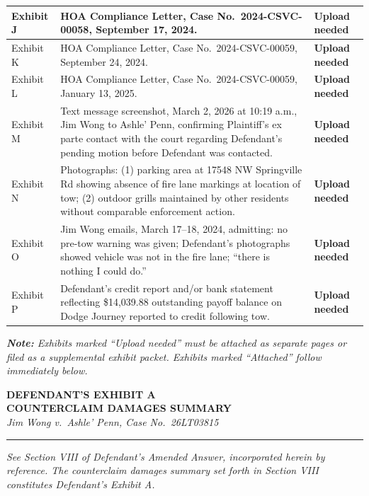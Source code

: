 \documentclass[12pt,letterpaper]{article}
\newcommand{\docshortname}{AMENDED ANSWER}
\begin{document}
\begin{singlespace}
\begin{longtable}{|p{0.7in}|p{4.8in}|p{0.7in}|}
\hline
Exhibit J & HOA Compliance Letter, Case No.\ 2024-CSVC-00058, September 17, 2024. & \textbf{Upload needed} \\
\hline
Exhibit K & HOA Compliance Letter, Case No.\ 2024-CSVC-00059, September 24, 2024. & \textbf{Upload needed} \\
\hline
Exhibit L & HOA Compliance Letter, Case No.\ 2024-CSVC-00059, January 13, 2025. & \textbf{Upload needed} \\
\hline
Exhibit M & Text message screenshot, March 2, 2026 at 10:19 a.m., Jim Wong to Ashle' Penn, confirming Plaintiff's ex parte contact with the court regarding Defendant's pending motion before Defendant was contacted. & \textbf{Upload needed} \\
\hline
Exhibit N & Photographs: (1) parking area at 17548 NW Springville Rd showing absence of fire lane markings at location of tow; (2) outdoor grills maintained by other residents without comparable enforcement action. & \textbf{Upload needed} \\
\hline
Exhibit O & Jim Wong emails, March 17--18, 2024, admitting: no pre-tow warning was given; Defendant's photographs showed vehicle was not in the fire lane; ``there is nothing I could do.'' & \textbf{Upload needed} \\
\hline
Exhibit P & Defendant's credit report and/or bank statement reflecting \$14,039.88 outstanding payoff balance on Dodge Journey reported to credit following tow. & \textbf{Upload needed} \\
\hline
\end{longtable}
\end{singlespace}

\vspace{8pt}
\noindent\textit{\textbf{Note:} Exhibits marked ``Upload needed'' must be attached as separate pages or filed as a supplemental exhibit packet. Exhibits marked ``Attached'' follow immediately below.}

\newpage
\renewcommand{\docshortname}{EXHIBIT A — COUNTERCLAIM DAMAGES SUMMARY}
\begin{center}
  {\large\bfseries DEFENDANT'S EXHIBIT A}\\[4pt]
  \textbf{COUNTERCLAIM DAMAGES SUMMARY}\\[4pt]
  \textit{Jim Wong v.\ Ashle' Penn, Case No.\ 26LT03815}\\
  \hrule
\end{center}
\vspace{8pt}
\textit{See Section VIII of Defendant's Amended Answer, incorporated herein by reference. The counterclaim damages summary set forth in Section VIII constitutes Defendant's Exhibit A.}
\end{document}
